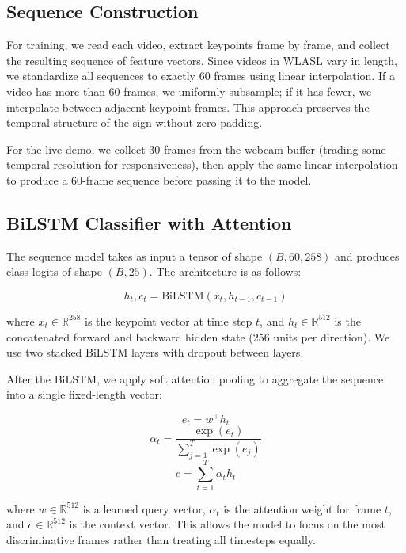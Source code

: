 \documentclass[conference]{IEEEtran}
\begin{document}
\subsection{Sequence Construction}

For training, we read each video, extract keypoints frame by frame, and collect the resulting sequence of feature vectors. Since videos in WLASL vary in length, we standardize all sequences to exactly 60 frames using linear interpolation. If a video has more than 60 frames, we uniformly subsample; if it has fewer, we interpolate between adjacent keypoint frames. This approach preserves the temporal structure of the sign without zero-padding.

For the live demo, we collect 30 frames from the webcam buffer (trading some temporal resolution for responsiveness), then apply the same linear interpolation to produce a 60-frame sequence before passing it to the model.

\subsection{BiLSTM Classifier with Attention}

The sequence model takes as input a tensor of shape $(B, 60, 258)$ and produces class logits of shape $(B, 25)$. The architecture is as follows:

\begin{equation}
    h_t, c_t = \text{BiLSTM}(x_t, h_{t-1}, c_{t-1})
\end{equation}

where $x_t \in \mathbb{R}^{258}$ is the keypoint vector at time step $t$, and $h_t \in \mathbb{R}^{512}$ is the concatenated forward and backward hidden state (256 units per direction). We use two stacked BiLSTM layers with dropout between layers.

After the BiLSTM, we apply soft attention pooling \cite{bahdanau2015attention} to aggregate the sequence into a single fixed-length vector:

\begin{equation}
    e_t = w^\top h_t
\end{equation}
\begin{equation}
    \alpha_t = \frac{\exp(e_t)}{\sum_{j=1}^{T} \exp(e_j)}
\end{equation}
\begin{equation}
    c = \sum_{t=1}^{T} \alpha_t h_t
\end{equation}

where $w \in \mathbb{R}^{512}$ is a learned query vector, $\alpha_t$ is the attention weight for frame $t$, and $c \in \mathbb{R}^{512}$ is the context vector. This allows the model to focus on the most discriminative frames rather than treating all timesteps equally.
\end{document}

